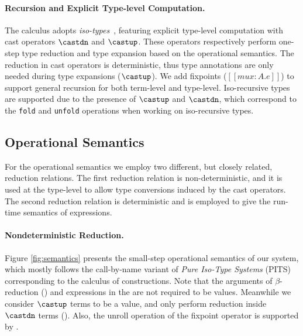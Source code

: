 \paragraph{Recursion and Explicit Type-level Computation.}
\label{sec:cast}
The \name calculus adopts \emph{iso-types}~\cite{yang2016unified,yang2019pure},
featuring explicit type-level computation with cast operators
$\castdn$ and $\castup$. These operators respectively perform one-step
type reduction and type expansion based on the operational semantics.
The reduction in cast operators is deterministic, thus type
annotations are only needed during type expansions ($\castup$). We add
fixpoints ($[[mu x : A. e]]$) to support general recursion for both
term-level and type-level. Iso-recursive types are supported due to
the presence of $\castup$ and $\castdn$, which correspond to the
\verb|fold| and \verb|unfold| operations when working on iso-recursive types.

\subsection{Operational Semantics}


For the operational semantics we employ two different, but closely related,
reduction relations. The first reduction relation is non-deterministic, and
it is used at the type-level to allow type conversions induced
by the cast operators. The second reduction relation is deterministic and
is employed to give the run-time semantics of expressions.

\paragraph{Nondeterministic Reduction.}
Figure \ref{fig:semantics} presents the small-step operational semantics of our system,
which mostly follows the call-by-name variant of \emph{Pure Iso-Type Systems} (PITS)
\cite{yang2019pure} corresponding to the calculus of constructions.
Note that the arguments of $\beta$-reduction () and expressions in
the  are not required to be values.
Meanwhile we consider $\castup$ terms to be a value,
and only perform reduction inside $\castdn$ terms (). Also, the unroll
operation of the fixpoint operator is supported by .

